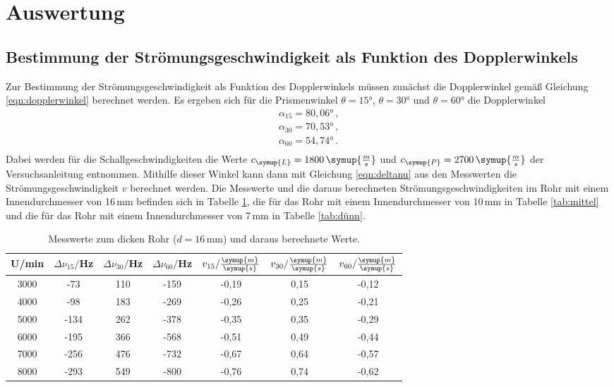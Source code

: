 \section{Auswertung}
\label{sec:Auswertung}

\subsection{Bestimmung der Strömungsgeschwindigkeit als Funktion des Dopplerwinkels}
\label{subsec:geschwindigkeit}

Zur Bestimmung der Strömungsgeschwindigkeit als Funktion des Dopplerwinkels müssen
zunächst die Dopplerwinkel gemäß Gleichung \eqref{eqn:dopplerwinkel} berechnet werden.
Es ergeben sich für die Prismenwinkel $\theta=15°$, $\theta=30°$ und $\theta=60°$
die Dopplerwinkel
\begin{align*}
  \alpha_{15}=80{,}06° \,,\\
  \alpha_{30}=70{,}53°\,,\\
  \alpha_{60}=54{,}74° \,.\\
\end{align*}
Dabei werden für die Schallgeschwindigkeiten die Werte $c_{\symup{L}}=1800\,\symup{\frac{m}{s}}$
und $c_{\symup{P}}=2700\,\symup{\frac{m}{s}}$ der Versuchsanleitung \cite{Versuchsanleitung} entnommen.
Mithilfe dieser Winkel kann dann mit Gleichung \eqref{eqn:deltanu} aus den
Messwerten die Strömungsgeschwindigkeit $v$ berechnet werden. Die Messwerte und die
daraus berechneten Strömungsgeschwindigkeiten im Rohr mit einem Innendurchmesser von
16\,mm befinden sich in Tabelle \ref{tab:dick}, die für das Rohr mit einem
Innendurchmesser von 10\,mm in Tabelle \ref{tab:mittel} und die für das Rohr
mit einem Innendurchmesser von 7\,mm in Tabelle \ref{tab:dünn}.

\begin{table}[htp]
	\begin{center}
    \caption{Messwerte zum dicken Rohr ($d=16\,$mm) und daraus berechnete Werte.}
    \label{tab:dick}
		\begin{tabular}{ccccccc}
		\toprule
			{U/min} & {$\Delta \nu_{15}/$Hz} & {$\Delta \nu_{30}/$Hz} & {$\Delta \nu_{60}/$Hz} &
      {$v_{15}/\frac{\symup{m}}{\symup{s}}$} & {$v_{30}/\frac{\symup{m}}{\symup{s}}$} &
      {$v_{60}/\frac{\symup{m}}{\symup{s}}$}\\
			\midrule
			3000 & -73 & 110 & -159 & -0,19 & 0,15 & -0,12\\
			4000 & -98 & 183 & -269 & -0,26 & 0,25 & -0,21\\
			5000 & -134 & 262 & -378 & -0,35 & 0,35 & -0,29\\
			6000 & -195 & 366 & -568 & -0,51 & 0,49 & -0,44\\
			7000 & -256 & 476 & -732 & -0,67 & 0,64 & -0,57\\
			8000 & -293 & 549 & -800 & -0,76 & 0,74 & -0,62\\
		\bottomrule
		\end{tabular}
	\end{center}
\end{table}

